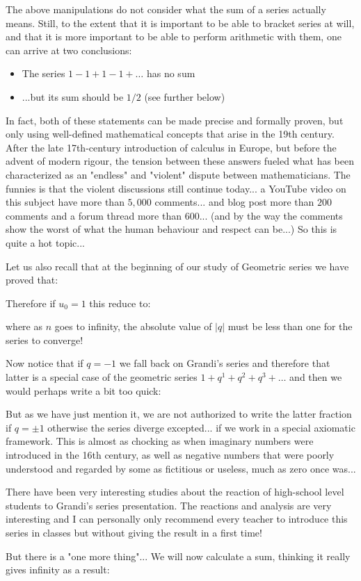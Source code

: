 	The above manipulations do not consider what the sum of a series actually means. Still, to the extent that it is important to be able to bracket series at will, and that it is more important to be able to perform arithmetic with them, one can arrive at two conclusions:
	\begin{itemize}
		\item The series $1-1 + 1-1 + \ldots$ has no sum

		\item ...but its sum should be $1/2$ (see further below)
	\end{itemize}
	In fact, both of these statements can be made precise and formally proven, but only using well-defined mathematical concepts that arise in the 19th century. After the late 17th-century introduction of calculus in Europe, but before the advent of modern rigour, the tension between these answers fueled what has been characterized as an "endless" and "violent" dispute between mathematicians. The funnies is that the violent discussions still continue today... a YouTube video on this subject have more than $5,000$ comments... and blog post more than $200$ comments and a forum thread more than $600$... (and by the way the comments show the worst of what the human behaviour and respect can be...) So this is quite a hot topic...
	
	Let us also recall that at the beginning of our study of Geometric series we have proved that:
	
	Therefore if $u_0=1$ this reduce to:
		
	where as $n$ goes to infinity, the absolute value of $|q|$ must be less than one for the series to converge!

	Now notice that if $q=-1$ we fall back on Grandi's series and therefore that latter is a special case of the geometric series $1+q^1+q^2+q^3+\ldots$ and then we would perhaps write a bit too quick:
	
	But as we have just mention it, we are not authorized to write the latter fraction if $q=\pm 1$ otherwise the series diverge excepted... if we work in a special axiomatic framework. This is almost as chocking as when imaginary numbers were introduced in the 16th century, as well as negative numbers that were poorly understood and regarded by some as fictitious or useless, much as zero once was...
	\begin{tcolorbox}[title=Remark,colframe=black,arc=10pt]
	There have been very interesting studies about the reaction of high-school level students to Grandi's series presentation. The reactions and analysis are very interesting and I can personally only recommend every teacher to introduce this series in classes but without giving the result in a first time!
	\end{tcolorbox}
	But there is a "one more thing"... We will now calculate a sum, thinking it really gives infinity as a result:
	
